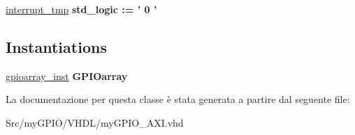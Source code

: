 \begin{DoxyCompactItemize}
\item 
\hypertarget{classmy_g_p_i_o___a_x_i_1_1arch__imp_gad7f656c91324519f1ad5d25d903037b1}{\hyperlink{group___a_x_i-internal_gad7f656c91324519f1ad5d25d903037b1}{interrupt\+\_\+tmp} {\bfseries \textcolor{vhdlchar}{std\+\_\+logic}\textcolor{vhdlchar}{ }\textcolor{vhdlchar}{ }\textcolor{vhdlchar}{\+:}\textcolor{vhdlchar}{=}\textcolor{vhdlchar}{ }\textcolor{vhdlchar}{ }\textcolor{vhdlchar}{'}\textcolor{vhdlchar}{ } \textcolor{vhdldigit}{0} \textcolor{vhdlchar}{ }\textcolor{vhdlchar}{'}\textcolor{vhdlchar}{ }} }\label{classmy_g_p_i_o___a_x_i_1_1arch__imp_gad7f656c91324519f1ad5d25d903037b1}

\end{DoxyCompactItemize}
\subsection*{Instantiations}
 \begin{DoxyCompactItemize}
\item 
\hypertarget{classmy_g_p_i_o___a_x_i_1_1arch__imp_aa9405ada469e1caaeffbfe0b4d9c061e}{\hyperlink{classmy_g_p_i_o___a_x_i_1_1arch__imp_aa9405ada469e1caaeffbfe0b4d9c061e}{gpioarray\+\_\+inst}  {\bfseries G\+P\+I\+Oarray}   }\label{classmy_g_p_i_o___a_x_i_1_1arch__imp_aa9405ada469e1caaeffbfe0b4d9c061e}

\end{DoxyCompactItemize}


La documentazione per questa classe è stata generata a partire dal seguente file\+:\begin{DoxyCompactItemize}
\item 
Src/my\+G\+P\+I\+O/\+V\+H\+D\+L/my\+G\+P\+I\+O\+\_\+\+A\+X\+I.\+vhd\end{DoxyCompactItemize}
